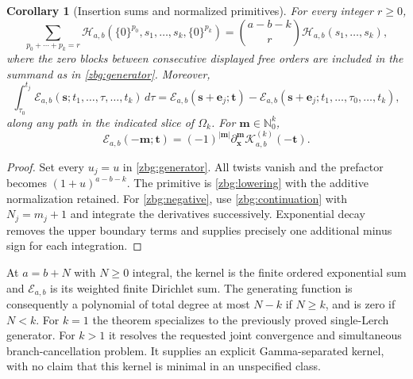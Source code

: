 \documentclass[11pt,letterpaper]{article}
\numberwithin{equation}{section}
\theoremstyle{plain}
\newtheorem{corollary}[theorem]{Corollary}
\theoremstyle{definition}
\theoremstyle{remark}
\begin{document}
\begin{corollary}[Insertion sums and normalized primitives]\label{zbg:corollaries}
For every integer $r\geq0$,
\begin{equation}\label{zbg:insertion}
 \sum_{p_0+\cdots+p_k=r}
 \mathcal H_{a,b}(\{0\}^{p_0},s_1,\ldots,s_k,\{0\}^{p_k})
 =\binom{a-b-k}{r}\mathcal H_{a,b}(s_1,\ldots,s_k),
\end{equation}
where the zero blocks between consecutive displayed free orders are
included in the summand as in \eqref{zbg:generator}.  Moreover,
\begin{equation}\label{zbg:primitive}
 \int_{\tau_0}^{t_j}\mathscr E_{a,b}(\boldsymbol s;
                      t_1,\ldots,\tau,\ldots,t_k)\,d\tau
 =\mathscr E_{a,b}(\boldsymbol s+\boldsymbol e_j;\boldsymbol t)
  -\mathscr E_{a,b}(\boldsymbol s+\boldsymbol e_j;
                     t_1,\ldots,\tau_0,\ldots,t_k),
\end{equation}
along any path in the indicated slice of $\Omega_k$.
For $\boldsymbol m\in\mathbb N_0^k$,
\begin{equation}\label{zbg:negative}
 \mathscr E_{a,b}(-\boldsymbol m;\boldsymbol t)
 =(-1)^{|\boldsymbol m|}
       \partial_{\boldsymbol x}^{\boldsymbol m}
            \mathscr K_{a,b}^{(k)}(-\boldsymbol t).
\end{equation}
\end{corollary}

\begin{proof}
Set every $u_j=u$ in \eqref{zbg:generator}.  All twists vanish and
the prefactor becomes $(1+u)^{a-b-k}$.  The primitive is
\eqref{zbg:lowering} with the additive normalization retained.
For \eqref{zbg:negative}, use \eqref{zbg:continuation} with
$N_j=m_j+1$ and integrate the derivatives successively.  Exponential
decay removes the upper boundary terms and supplies precisely one
additional minus sign for each integration.
\end{proof}

At $a=b+N$ with $N\geq0$ integral, the kernel is the finite ordered
exponential sum and $\mathscr E_{a,b}$ is its weighted finite
Dirichlet sum.  The generating function is consequently a polynomial
of total degree at most $N-k$ if $N\geq k$, and is zero if $N<k$.
For $k=1$ the theorem specializes to the previously proved
single-Lerch generator.  For $k>1$ it resolves the requested joint
convergence and simultaneous branch-cancellation problem.  It supplies
an explicit Gamma-separated kernel, with no claim that this kernel is
minimal in an unspecified class.
\end{document}
